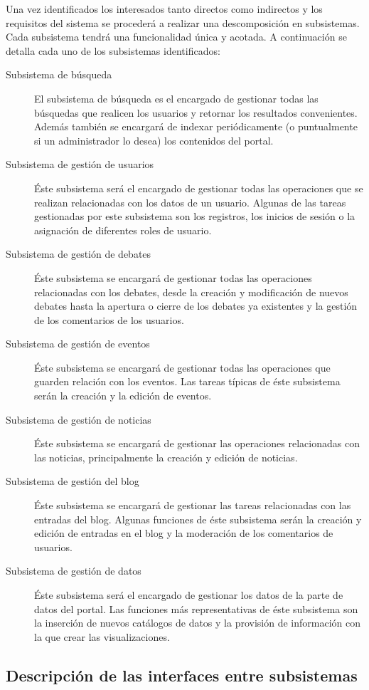 Una vez identificados los interesados tanto directos como indirectos y los requisitos del sistema se procederá a realizar una descomposición en subsistemas.  Cada subsistema tendrá una funcionalidad única y acotada.\newline
A continuación se detalla cada uno de los subsistemas identificados:

\begin{description}
\item[Subsistema de búsqueda]  El subsistema de búsqueda es el encargado de gestionar todas las búsquedas que realicen los usuarios y retornar los resultados convenientes.  Además también se encargará de indexar periódicamente (o puntualmente si un administrador lo desea) los contenidos del portal.
\item[Subsistema de gestión de usuarios]  Éste subsistema será el encargado de gestionar todas las operaciones que se realizan relacionadas con los datos de un usuario.  Algunas de las tareas gestionadas por este subsistema son los registros, los inicios de sesión o la asignación de diferentes roles de usuario.
\item[Subsistema de gestión de debates]  Éste subsistema se encargará de gestionar todas las operaciones relacionadas con los debates, desde la creación y modificación de nuevos debates hasta la apertura o cierre de los debates ya existentes y la gestión de los comentarios de los usuarios.
\item[Subsistema de gestión de eventos]  Éste subsistema se encargará de gestionar todas las operaciones que guarden relación con los eventos.  Las tareas típicas de éste subsistema serán la creación y la edición de eventos.
\item[Subsistema de gestión de noticias]  Éste subsistema se encargará de gestionar las operaciones relacionadas con las noticias, principalmente la creación y edición de noticias.
\item[Subsistema de gestión del blog]  Éste subsistema se encargará de gestionar las tareas relacionadas con las entradas del blog.  Algunas funciones de éste subsistema serán la creación y edición de entradas en el blog y la moderación de los comentarios de usuarios.
\item[Subsistema de gestión de datos]  Éste subsistema será el encargado de gestionar los datos de la parte de datos del portal.  Las funciones más representativas de éste subsistema son la inserción de nuevos catálogos de datos y la provisión de información con la que crear las visualizaciones.
\end{description}


\subsection{Descripción de las interfaces entre subsistemas}